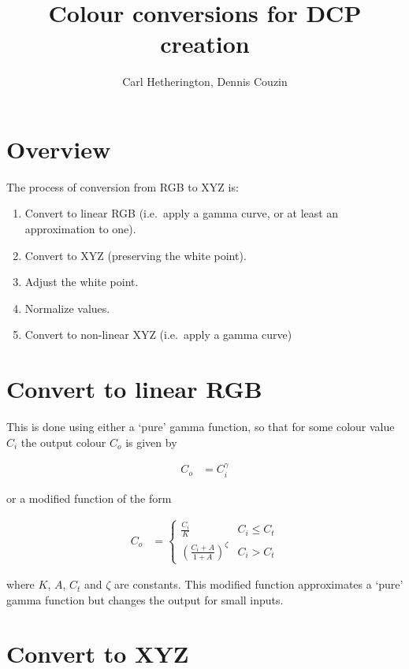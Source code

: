 \documentclass{article}
\title{Colour conversions for DCP creation}
\author{Carl Hetherington, Dennis Couzin}
\date{}
\begin{document}
\maketitle

\section{Overview}

The process of conversion from RGB to XYZ is:

\begin{enumerate}
\item Convert to linear RGB (i.e.\ apply a gamma curve, or at least an approximation to one).
\item Convert to XYZ (preserving the white point).
\item Adjust the white point.
\item Normalize values.
\item Convert to non-linear XYZ (i.e.\ apply a gamma curve)
\end{enumerate}


\section{Convert to linear RGB}

This is done using either a `pure' gamma function, so that for some colour value $C_i$ the output colour $C_o$ is given by

\begin{align}
C_o &= C_i ^ \gamma
\end{align}

or a modified function of the form

\begin{align}
C_o &= \left\{
\begin{array}{ll}
\frac{C_i}{K} & C_i \leq C_t \\
\left( \frac{C_i + A}{1 + A} \right)^\zeta & C_i > C_t
\end{array}
\right.
\end{align}

where $K$, $A$, $C_t$ and $\zeta$ are constants.  This modified function approximates a `pure' gamma function but changes the output for small inputs.


\section{Convert to XYZ}
\end{document}
